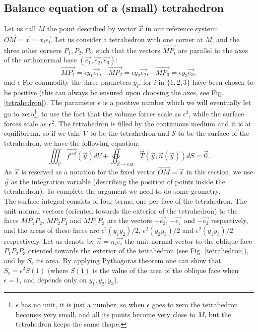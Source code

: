 \documentclass[DIV=12]{article}
\newcommand{\vol}{\mathcal{V}}
\newcommand{\sExt}{{{\mathcal{S}}\rightarrow{\mathrm{ext}}}}
\newcommand{\intVol}{\iiint}
\newcommand{\fVol}{\overrightarrow{f^{vol}}}
\newcommand{\eBase}{(\vec{e_1}, \vec{e_2},\vec{e_3})}
\begin{document}
\subsection{Balance equation of a (small) tetrahedron}
 Let us call $M$ the point described by vector $\vec{x}$ in our reference system: $\overrightarrow{OM} = \vec{x} = x_i \vec{e_i}$.
 Let us consider a tetrahedron with one corner at $M$,
 and the three other corners $P_1, P_2, P_3$, such that 
 the vectors $\overrightarrow{MP_i}$ are parallel to the axes of the orthonormal base $\eBase$:
 \begin{equation}
 \overrightarrow{MP_1} = \epsilon y_1 \vec{e_1},\;\;\;\overrightarrow{MP_2} = \epsilon y_2 \vec{e_2},\;\;\; \overrightarrow{MP_3} = \epsilon y_3 \vec{e_3},
 \end{equation}
 and $\epsilon$ 
 For commodity the three parmeters $y_i$, for $i$ in $\{1,2,3\}$ have been chosen to be positive (this can always be ensured upon 
 choosing the axes, see Fig. \ref{tetrahedron}). 
The parameter $\epsilon$ is a positive number which we will eventually let go to zero\footnote{$\epsilon$ has no unit, it is just a number, so when $\epsilon$ goes to zero the tetrahedron 
 becomes very small, and all its points become very close to $M$, but the tetrahedron keeps the same shape.},
 to use the fact that the volume forces scale as $\epsilon^3$, while the surface forces scale as $\epsilon^2$.
 The tetrahedron is filled by the continuous medium and it is at equilibrium,
 so if we take $\vol$ to be the tetrahedron and $\mathcal{S}$ to be the surface of the tetrahedron, we have 
 the following equation:
\begin{equation}
 \intVol_{\vol} \fVol( \vec{y}) dV  +  \oiint_{\sExt} \vec{T}( \vec{y},\vec{n}(\vec{y} )) dS = \vec{0}.
\label{CauchyEq}
\end{equation}
 As $\vec{x}$ is reserved as a notation for the fixed vector $\overrightarrow{OM}=\vec{x}$ in this section,
 we use $\vec{y}$ as the integration variable (describing the  position of points inside the tetrahedron). 
 To complete the argument we need to do some geometry.\\

 The surface integral consists of four terms, one per face of the tetrahedron.
 The unit normal vectors (oriented towards the exterior of the tetrahedron) to the faces $MP_1P_2$, $MP_2P_3$ and $MP_1P_3$ are 
 the vectors $-\vec{e_3}$, $-\vec{e_1}$ and  $-\vec{e_2}$ respectively, and the areas of these faces are $ \epsilon^2(y_1y_2)/2$,
  $\epsilon^2(y_2y_3)/2$ and  $\epsilon^2(y_1y_3)/2$ respectively. Let us denote by $\vec{n} = n_i \vec{e_i}$
 the unit normal vector to the oblique face $P_1P_2P_3$ oriented towards the exterior of the tetrahedron (see Fig. \ref{tetrahedron}), and by $S_\epsilon$
 its area. By applying Pythagoras theorem one can show that $S_\epsilon = \epsilon^2 S(1)$ (where $S(1)$ is the value of the area of the
 oblique face when $\epsilon = 1$, and depends only on $y_1, y_2, y_3$).\\
\end{document}
